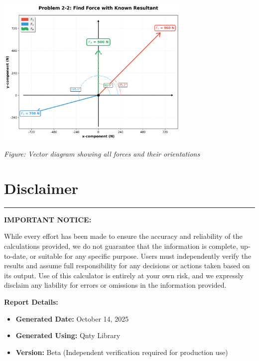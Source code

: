 \documentclass[11pt,a4paper]{article}
\begin{document}
\begin{center}
\includegraphics[width=0.7\textwidth]{Problem_2-2_Find_Force_with_Known_Resultant_diagram.png}
\end{center}

\begin{center}
\textit{Figure: Vector diagram showing all forces and their orientations}
\end{center}


\clearpage

\section*{Disclaimer}

\begin{center}
\rule{\textwidth}{0.4pt}
\end{center}

\noindent\textbf{IMPORTANT NOTICE:}

\noindent While every effort has been made to ensure the accuracy and reliability of the calculations provided, we do not guarantee that the information is complete, up-to-date, or suitable for any specific purpose. Users must independently verify the results and assume full responsibility for any decisions or actions taken based on its output. Use of this calculator is entirely at your own risk, and we expressly disclaim any liability for errors or omissions in the information provided.

\vspace{1em}

\noindent\textbf{Report Details:}
\begin{itemize}
\item \textbf{Generated Date:} October 14, 2025
\item \textbf{Generated Using:} Qnty Library
\item \textbf{Version:} Beta (Independent verification required for production use)
\end{itemize}
\end{document}
